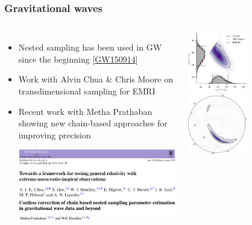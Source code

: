 \documentclass[aspectratio=169]{beamer}
\begin{document}
\begin{frame}
    \frametitle{Gravitational waves}
    \begin{columns}
        \begin{itemize}
            \item Nested sampling has been used in GW since the beginning [\textcolor{C0}{\href{https://arxiv.org/abs/1602.03840}{GW150914}}]
            \item Work with Alvin Chua \& Chris Moore on transdimensional sampling for EMRI~
            \item Recent work with Metha Prathaban showing new chain-based approaches for improving precision 

                \includegraphics[width=\textwidth]{figures/gw_chua.pdf}
                \vspace{8pt}
                \includegraphics[width=\textwidth]{figures/gw_prathaban.pdf}
        \end{itemize}
        \includegraphics[width=0.49\textwidth]{figures/ligo_m1_m2.pdf}%
        \includegraphics[width=0.49\textwidth]{figures/ligo_lambert-skymap.pdf}

\end{columns}
\end{frame}
\end{document}
